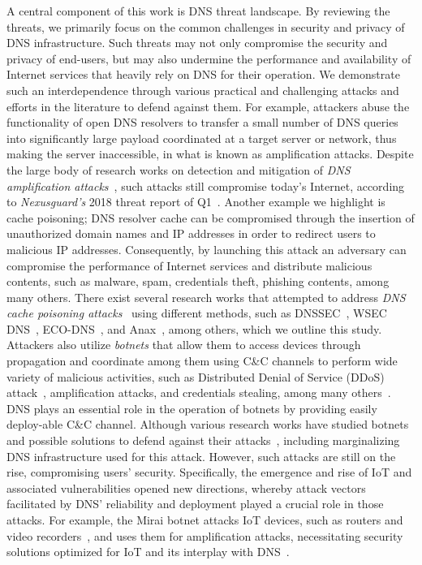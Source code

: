 A central component of this work is DNS threat landscape. By reviewing the threats, we primarily focus on the common challenges in security and privacy of DNS infrastructure. Such threats may not only compromise the security and privacy of end-users, but may also undermine the performance and availability of Internet services that heavily rely on DNS for their operation. We demonstrate such an interdependence through various practical and challenging attacks and efforts in the literature to defend against them. For example, attackers abuse the functionality of open DNS resolvers to transfer a small number of DNS queries into significantly large payload coordinated at a target server or network, thus making the server inaccessible, in what is known as amplification attacks. Despite the large body of research works on detection and mitigation of \textit{DNS amplification attacks}~, such attacks still compromise today's Internet, according to \textit{Nexusguard's} 2018 threat report of Q1~. 
Another example we highlight is cache poisoning; DNS resolver cache can be compromised through the insertion of unauthorized domain names and IP addresses in order to redirect users to malicious IP addresses. Consequently, by launching this attack an adversary can compromise the performance of Internet services and distribute malicious contents, such as malware, spam, credentials theft, phishing contents, among many others. There exist several research works that attempted to address \textit{DNS cache poisoning attacks}~ using different methods, such as DNSSEC~, WSEC DNS~, ECO-DNS~, and Anax~, among others, which we outline this study.
Attackers also utilize \textit{botnets} that allow them to access devices through propagation and coordinate among them using C\&C channels to perform wide variety of malicious activities, such as Distributed Denial of Service (DDoS) attack~, amplification attacks, and credentials stealing,  among many others~. DNS plays an essential role in the operation of botnets by providing easily deploy-able C\&C channel. Although various research works have studied botnets and possible solutions to defend against their attacks~, including marginalizing DNS infrastructure used for this attack. However, such attacks are still on the rise, compromising users' security. Specifically, the emergence and rise of IoT and associated vulnerabilities opened new directions, whereby attack vectors facilitated by DNS' reliability and deployment played a crucial role in those attacks. For example, the Mirai botnet attacks  IoT devices, such as routers and video recorders~, and uses them for amplification attacks, necessitating  security solutions optimized for IoT and its interplay with DNS~. 
